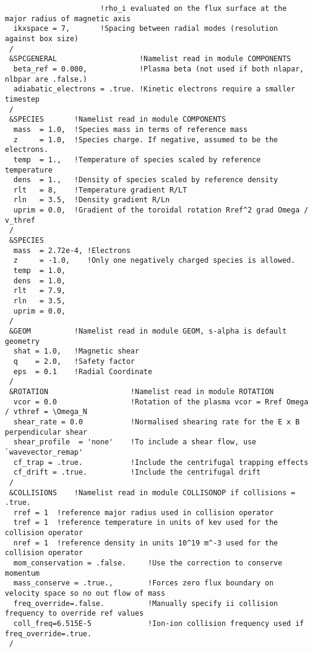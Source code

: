 \begin{scriptsize}
\begin{verbatim}
                      !rho_i evaluated on the flux surface at the major radius of magnetic axis
  ikxspace = 7,       !Spacing between radial modes (resolution against box size)
 /
 &SPCGENERAL                   !Namelist read in module COMPONENTS
  beta_ref = 0.000,            !Plasma beta (not used if both nlapar, nlbpar are .false.)
  adiabatic_electrons = .true. !Kinetic electrons require a smaller timestep
 /
 &SPECIES       !Namelist read in module COMPONENTS
  mass  = 1.0,  !Species mass in terms of reference mass
  z     = 1.0,  !Species charge. If negative, assumed to be the electrons.
  temp  = 1.,   !Temperature of species scaled by reference temperature 
  dens  = 1.,   !Density of species scaled by reference density 
  rlt   = 8,    !Temperature gradient R/LT
  rln   = 3.5,  !Density gradient R/Ln
  uprim = 0.0,  !Gradient of the toroidal rotation Rref^2 grad Omega / v_thref
 / 
 &SPECIES 
  mass  = 2.72e-4, !Electrons
  z     = -1.0,    !Only one negatively charged species is allowed.
  temp  = 1.0, 
  dens  = 1.0,
  rlt   = 7.9,
  rln   = 3.5, 
  uprim = 0.0,
 /
 &GEOM          !Namelist read in module GEOM, s-alpha is default geometry
  shat = 1.0,   !Magnetic shear
  q    = 2.0,   !Safety factor
  eps  = 0.1    !Radial Coordinate
 /
 &ROTATION                   !Namelist read in module ROTATION
  vcor = 0.0                 !Rotation of the plasma vcor = Rref Omega / vthref = \Omega_N
  shear_rate = 0.0           !Normalised shearing rate for the E x B perpendicular shear 
  shear_profile  = 'none'    !To include a shear flow, use `wavevector_remap'
  cf_trap = .true.           !Include the centrifugal trapping effects           
  cf_drift = .true.          !Include the centrifugal drift
 /
 &COLLISIONS    !Namelist read in module COLLISONOP if collisions = .true.
  rref = 1  !reference major radius used in collision operator 
  tref = 1  !reference temperature in units of kev used for the collision operator
  nref = 1  !reference density in units 10^19 m^-3 used for the collision operator
  mom_conservation = .false.     !Use the correction to conserve momentum
  mass_conserve = .true.,        !Forces zero flux boundary on velocity space so no out flow of mass   
  freq_override=.false.          !Manually specify ii collision frequency to override ref values 
  coll_freq=6.515E-5             !Ion-ion collision frequency used if freq_override=.true.
 /
\end{verbatim} 
\end{scriptsize}

